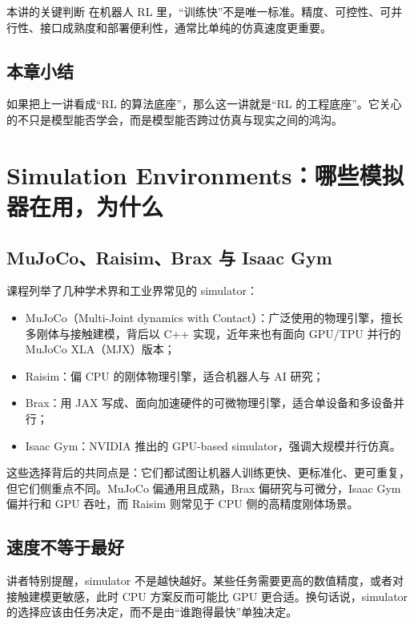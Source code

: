 \documentclass[a4paper]{article}
\begin{document}
\begin{importantbox}{本讲的关键判断}
在机器人 RL 里，“训练快”不是唯一标准。精度、可控性、可并行性、接口成熟度和部署便利性，通常比单纯的仿真速度更重要。
\end{importantbox}

\subsection{本章小结}

如果把上一讲看成“RL 的算法底座”，那么这一讲就是“RL 的工程底座”。它关心的不只是模型能否学会，而是模型能否跨过仿真与现实之间的鸿沟。

\section{Simulation Environments：哪些模拟器在用，为什么}

\subsection{MuJoCo、Raisim、Brax 与 Isaac Gym}

课程列举了几种学术界和工业界常见的 simulator：
\begin{itemize}
  \item MuJoCo（Multi-Joint dynamics with Contact）：广泛使用的物理引擎，擅长多刚体与接触建模，背后以 C++ 实现，近年来也有面向 GPU/TPU 并行的 MuJoCo XLA（MJX）版本；
  \item Raisim：偏 CPU 的刚体物理引擎，适合机器人与 AI 研究；
  \item Brax：用 JAX 写成、面向加速硬件的可微物理引擎，适合单设备和多设备并行；
  \item Isaac Gym：NVIDIA 推出的 GPU-based simulator，强调大规模并行仿真。
\end{itemize}

这些选择背后的共同点是：它们都试图让机器人训练更快、更标准化、更可重复，但它们侧重点不同。MuJoCo 偏通用且成熟，Brax 偏研究与可微分，Isaac Gym 偏并行和 GPU 吞吐，而 Raisim 则常见于 CPU 侧的高精度刚体场景。

\subsection{速度不等于最好}

讲者特别提醒，simulator 不是越快越好。某些任务需要更高的数值精度，或者对接触建模更敏感，此时 CPU 方案反而可能比 GPU 更合适。换句话说，simulator 的选择应该由任务决定，而不是由“谁跑得最快”单独决定。
\end{document}
